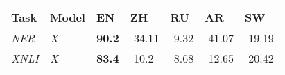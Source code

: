\documentclass[times, utf8, seminar, english]{fer}
\begin{document}
\begin{longtable}[c]{|l|l|lllll|}
	\hline
	\textbf{Task} &
	\textbf{Model} &
	\multicolumn{1}{l|}{\textbf{EN}} &
	\multicolumn{1}{l|}{\textbf{ZH}} &
	\multicolumn{1}{l|}{\textbf{RU}} &
	\multicolumn{1}{l|}{\textbf{AR}} &
	\textbf{SW} \\ \hline
	\endfirsthead
	\endhead
	\textit{NER} &
	\textit{X} &
	\textbf{90.2} &
	-34.11 &
	-9.32 &
	-41.07 &
	-19.19 \\ \cline{1-2}
	\textit{XNLI} &
	\textit{X} &
	\textbf{83.4} &
	-10.2 &
	-8.68 &
	-12.65 &
	-20.42 \\ \hline
\end{longtable}







\end{document}

